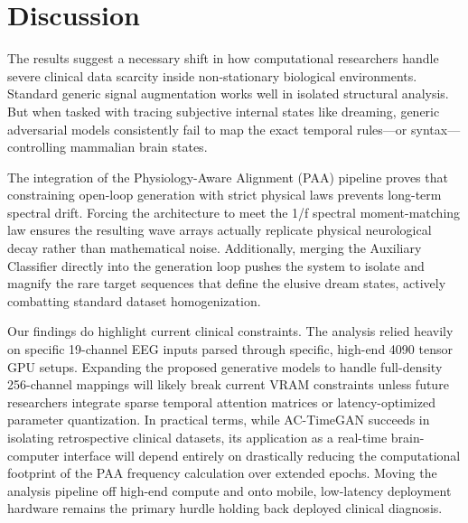 \documentclass[journal,10pt,twocolumn]{IEEEtran}
\begin{document}
\section{Discussion}
The results suggest a necessary shift in how computational researchers handle severe clinical data scarcity inside non-stationary biological environments. Standard generic signal augmentation works well in isolated structural analysis. But when tasked with tracing subjective internal states like dreaming, generic adversarial models consistently fail to map the exact temporal rules—or syntax—controlling mammalian brain states. 

The integration of the Physiology-Aware Alignment (PAA) pipeline proves that constraining open-loop generation with strict physical laws prevents long-term spectral drift. Forcing the architecture to meet the 1/f spectral moment-matching law ensures the resulting wave arrays actually replicate physical neurological decay rather than mathematical noise. Additionally, merging the Auxiliary Classifier directly into the generation loop pushes the system to isolate and magnify the rare target sequences that define the elusive dream states, actively combatting standard dataset homogenization.

Our findings do highlight current clinical constraints. The analysis relied heavily on specific 19-channel EEG inputs parsed through specific, high-end 4090 tensor GPU setups. Expanding the proposed generative models to handle full-density 256-channel mappings will likely break current VRAM constraints unless future researchers integrate sparse temporal attention matrices or latency-optimized parameter quantization. In practical terms, while AC-TimeGAN succeeds in isolating retrospective clinical datasets, its application as a real-time brain-computer interface will depend entirely on drastically reducing the computational footprint of the PAA frequency calculation over extended epochs. Moving the analysis pipeline off high-end compute and onto mobile, low-latency deployment hardware remains the primary hurdle holding back deployed clinical diagnosis.
\end{document}
